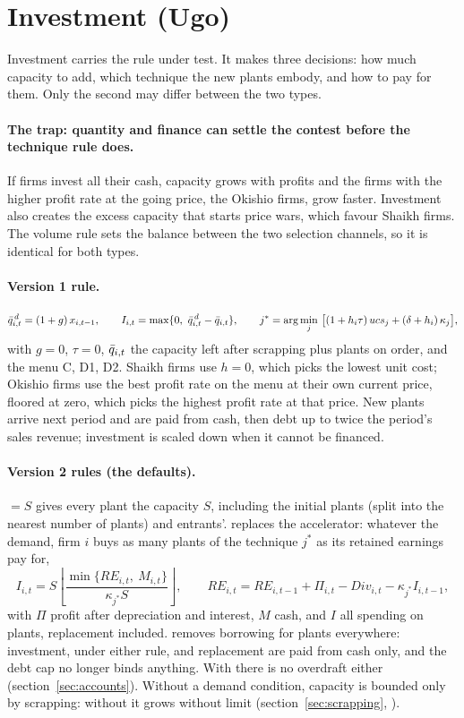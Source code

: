 \section{Investment (Ugo)}\label{sec:investment}

Investment carries the rule under test. It makes three decisions: how much capacity to add,
which technique the new plants embody, and how to pay for them. Only the second may differ
between the two types.

\paragraph{The trap: quantity and finance can settle the contest before the technique rule
does.} If firms invest all their cash, capacity grows with profits and the firms with the
higher profit rate at the going price, the Okishio firms, grow faster. Investment also
creates the excess capacity that starts price wars, which favour Shaikh firms. The volume
rule sets the balance between the two selection channels, so it is identical for both types.

\paragraph{Version 1 rule.}
\[
\bar q^{\,d}_{i,t} = (1+g)\, x_{i,t-1}, \qquad
I_{i,t} = \max\{0,\ \bar q^{\,d}_{i,t} - \bar q_{i,t}\}, \qquad
j^{*} = \arg\min_{j}\, \big[(1 + h_i\tau)\, ucs_j + (\delta + h_i)\, \kappa_j\big],
\]
with $g = 0$, $\tau = 0$, $\bar q_{i,t}$ the capacity left after scrapping plus plants on
order, and the menu C, D1, D2. Shaikh firms use $h = 0$, which picks the lowest unit cost;
Okishio firms use the best profit rate on the menu at their own current price, floored at
zero, which picks the highest profit rate at that price. New plants arrive next period and
are paid from cash, then debt up to twice the period's sales revenue; investment is scaled
down when it cannot be financed.

\paragraph{Version 2 rules (the defaults).}  $= S$ gives every plant the
capacity $S$, including the initial plants (split into the nearest number of plants) and
entrants'.  replaces the accelerator: whatever
the demand, firm $i$ buys as many plants of the technique $j^*$ as its retained earnings pay
for,
\[
I_{i,t} = S \left\lfloor \frac{\min\{RE_{i,t},\ M_{i,t}\}}{\kappa_{j^*} S} \right\rfloor,
\qquad RE_{i,t} = RE_{i,t-1} + \Pi_{i,t} - \mathit{Div}_{i,t} - \kappa_{j^*} I_{i,t-1},
\]
with $\Pi$ profit after depreciation and interest, $M$ cash, and $I$ all spending on plants,
replacement included.  removes borrowing for plants everywhere:
investment, under either rule, and replacement are paid from cash only, and the debt cap no
longer binds anything. With  there is no overdraft
either (section~\ref{sec:accounts}). Without a demand condition,
capacity is bounded only by scrapping: without  it grows without limit
(section~\ref{sec:scrapping}, ).

